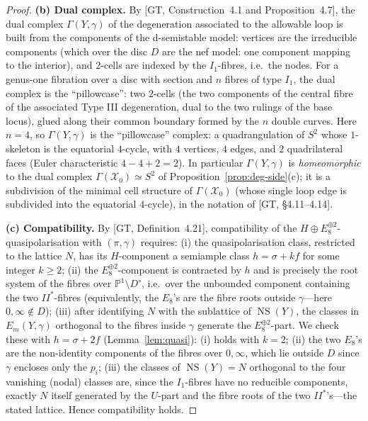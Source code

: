 \documentclass[11pt]{article}
\newcommand{\X}{\mathcal{X}}
\newcommand{\PP}{\mathbb{P}}
\DeclareMathOperator{\NS}{NS}
\begin{document}
\begin{proof}
\textbf{(b) Dual complex.} By [GT, Construction~4.1 and Proposition~4.7],
the dual complex $\Gamma(Y,\gamma)$ of the degeneration associated to the
allowable loop is built from the components of the d-semistable model:
vertices are the irreducible components (which over the disc $D$ are the
nef model: one component mapping to the interior), and $2$-cells are
indexed by the $I_1$-fibres, i.e.\ the nodes. For a genus-one fibration
over a disc with section and $n$ fibres of type $I_1$, the dual complex is
the ``pillowcase'': two $2$-cells (the two components of the central fibre
of the associated Type III degeneration, dual to the two rulings of the
base locus), glued along their common boundary formed by the $n$ double
curves. Here $n=4$, so $\Gamma(Y,\gamma)$ is the ``pillowcase''
complex: a quadrangulation of $S^2$ whose $1$-skeleton is the equatorial
$4$-cycle, with $4$ vertices, $4$ edges, and $2$ quadrilateral faces
(Euler characteristic $4-4+2=2$). In particular
$\Gamma(Y,\gamma)$ is \emph{homeomorphic} to the dual complex
$\Gamma(\X_0)\simeq S^2$ of Proposition~\ref{prop:deg-side}(c); it is a
subdivision of the minimal cell structure of $\Gamma(\X_0)$ (whose single
loop edge is subdivided into the equatorial $4$-cycle), in the notation
of [GT, \S4.11--4.14].

\textbf{(c) Compatibility.} By [GT, Definition~4.21], compatibility of the
$H\oplus E_8^{\oplus2}$-quasipolarisation with $(\pi,\gamma)$ requires:
(i) the quasipolarisation class, restricted to the lattice $N$, has its
$H$-component a semiample class $h=\sigma+kf$ for some integer $k\ge2$;
(ii) the $E_8^{\oplus2}$-component is contracted by $h$ and is precisely
the root system of the fibres over $\PP^1\setminus D^\circ$, i.e.\ over the
unbounded component containing the two $II^*$-fibres (equivalently, the
$E_8$'s are the fibre roots outside $\gamma$---here $0,\infty\notin D$);
(iii) after identifying $N$ with the sublattice of $\NS(Y)$, the classes in
$E_m(Y,\gamma)$ orthogonal to the fibres inside $\gamma$ generate the
$E_8^{\oplus 2}$-part. We check these with $h=\sigma+2f$
(Lemma~\ref{lem:quasi}): (i) holds with $k=2$; (ii) the two $E_8$'s are
the non-identity components of the fibres over $0,\infty$, which lie outside
$D$ since $\gamma$ encloses only the $p_i$; (iii) the classes of
$\NS(Y)=N$ orthogonal to the four vanishing (nodal) classes are, since the
$I_1$-fibres have no reducible components, exactly $N$ itself generated by
the $U$-part and the fibre roots of the two $II^*$'s---the stated lattice.
Hence compatibility holds.


\end{proof}
\end{document}
